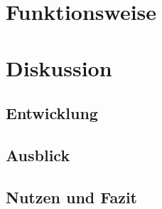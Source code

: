 \documentclass[a4paper,12pt,ngerman]{scrartcl}
\begin{document}
\newpage


\section{Funktionsweise}



\newpage

\section{Diskussion}

\subsection{Entwicklung}

\subsection{Ausblick}

\subsection{Nutzen und Fazit}

\newpage
\end{document}
